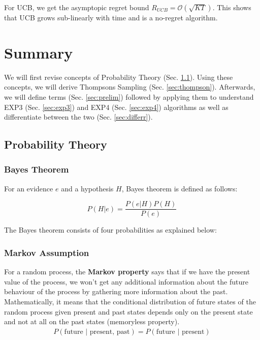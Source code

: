 \documentclass[11pt]{article}
\begin{document}
For UCB, we get the asymptopic regret bound $R_{UCB} = \mathcal{O}(\sqrt{KT})$. This shows that UCB grows sub-linearly with time and is a no-regret algorithm.

\section{Summary}
We will first revise concepts of Probability Theory (Sec. \ref{sec:prob}). Using these concepts, we will derive Thompsons Sampling (Sec. \ref{sec:thompson}). Afterwards, we will define terms (Sec. \ref{sec:prelim}) followed by applying them to understand EXP3 (Sec. \ref{sec:exp3}) and EXP4 (Sec. \ref{sec:exp4}) algorithms as well as differentiate between the two (Sec. \ref{sec:differr}).


\subsection{Probability Theory}
\label{sec:prob}

\subsubsection{Bayes Theorem}

For an evidence $e$ and a hypothesis $H$, Bayes theorem is defined as follows:

\begin{equation}
    P(H|e) = \frac{P(e|H)P(H)}{P(e)}
    \label{eq: bayes}
\end{equation}

The Bayes theorem consists of four probabilities as explained below:
\normalfont
{}
\normalfont
{}
\normalfont
{}
\normalfont

\subsubsection{Markov Assumption}
For a random process, the \textbf{Markov property} \cite{markovproperty} says that if we have the present value of the process, we won't get any additional information about the future behaviour of the process by gathering more information about the past. Mathematically, it means that the conditional distribution of future states of the random process given present and past states depends only on the present state and not at all on the past states (memoryless property).
\begin{align}
    P(\text{future } | \text{ present, past}) = P(\text{future } | \text{ present})
\end{align}
\end{document}

